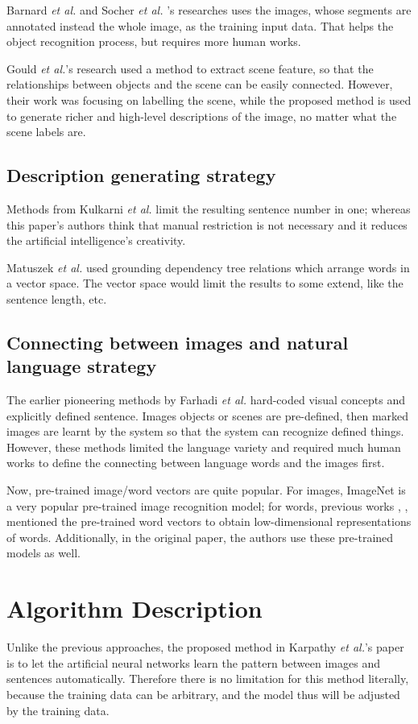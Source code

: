 \documentclass[10pt,twocolumn,letterpaper]{article}
\begin{document}
Barnard \textit{et al.} \cite{barnard} and Socher \textit{et al.} \cite{socher}'s researches uses the images,
whose segments are annotated instead the whole image, as the training input data.
That helps the object recognition process, but requires more human works.

Gould \textit{et al.}'s research \cite {gould} used a method to extract scene feature,
so that the relationships between objects and the scene can be easily connected.
However, their work was focusing on labelling the scene, while the proposed method is used to
generate richer and high-level descriptions of the image, no matter what the scene labels are.


\subsection{Description generating strategy}
Methods from Kulkarni \textit{et al.} \cite{kulkarni} limit the resulting sentence number in one;
whereas this paper's authors think that manual restriction is not necessary and it reduces the artificial intelligence's creativity.

Matuszek \textit{et al.} \cite{matuszek} used grounding dependency tree relations which arrange words in a vector space.
The vector space would limit the results to some extend, like the sentence length, etc.


\subsection{Connecting between images and natural language strategy}
The earlier pioneering methods by Farhadi \textit{et al.} \cite{farhadi} hard-coded visual concepts and explicitly defined sentence.
Images objects or scenes are pre-defined, then marked images are learnt by the system so that the system can recognize defined things.
However, these methods limited the language variety and required much human works to define the connecting between language words and the images first.

Now, pre-trained image/word vectors are quite popular.
For images, ImageNet \cite{imagenet} is a very popular pre-trained image recognition model;
for words, previous works \cite{bengio}, \cite{socher2}, \cite{mikolov} mentioned the pre-trained word vectors
to obtain low-dimensional representations of words.
Additionally, in the original paper, the authors use these pre-trained models as well.


\section{Algorithm Description}
Unlike the previous approaches, the proposed method in Karpathy \textit{et al.}'s paper is to let the artificial neural networks
learn the pattern between images and sentences automatically.
Therefore there is no limitation for this method literally,
because the training data can be arbitrary, and the model thus will be adjusted by the training data.
\end{document}

